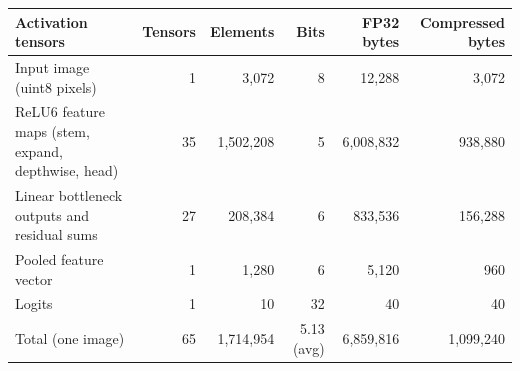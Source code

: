 \begin{tabular}{lrrrrr}
\toprule
Activation tensors & Tensors & Elements & Bits & FP32 bytes & Compressed bytes \\
\midrule
Input image (uint8 pixels) & 1 & 3,072 & 8 & 12,288 & 3,072 \\
ReLU6 feature maps (stem, expand, depthwise, head) & 35 & 1,502,208 & 5 & 6,008,832 & 938,880 \\
Linear bottleneck outputs and residual sums & 27 & 208,384 & 6 & 833,536 & 156,288 \\
Pooled feature vector & 1 & 1,280 & 6 & 5,120 & 960 \\
Logits & 1 & 10 & 32 & 40 & 40 \\
\midrule
Total (one image) & 65 & 1,714,954 & 5.13 (avg) & 6,859,816 & 1,099,240 \\
\bottomrule
\end{tabular}
